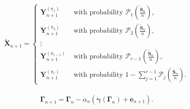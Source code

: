 \documentclass[10pt,a4paper]{amsart}
\begin{document}
\begin{align}\label{eq12}
           \boldsymbol{\widetilde{X}}_{n+1} = \begin{cases}
               \boldsymbol{Y}^{({\pi}_1)}_{n+1} &\text{ with probability }   \mathcal{P}_1\left(\frac{\boldsymbol{\widetilde{S}}_n}{n}\right), \\ \boldsymbol{Y}^{({\pi}_2)}_{n+1} &\text{ with probability }   \mathcal{P}_2\left(\frac{\boldsymbol{\widetilde{S}}_n}{n}\right), \\ \vdots \\ \boldsymbol{Y}^{({\pi}_{r-1})}_{n+1} &\text{ with probability }   \mathcal{P}_{r-1}\left(\frac{\boldsymbol{\widetilde{S}}_n}{n}\right), \\ 
               \boldsymbol{Y}^{({\pi}_r)}_{n+1} &\text{ with probability } 1-\sum_{j=1}^{r-1}\mathcal{P}_j\left(\frac{\boldsymbol{\widetilde{S}}_n}{n}\right).
           \end{cases}
\end{align}

\begin{align}\label{eq-sa2}
   \boldsymbol{\Gamma}_{n+1} = \boldsymbol{\Gamma}_{n} - \alpha_n\left(\boldsymbol{\gamma}(\boldsymbol{\Gamma}_{n}) + \boldsymbol{e}_{n+1}\right).
\end{align}
\end{document}
